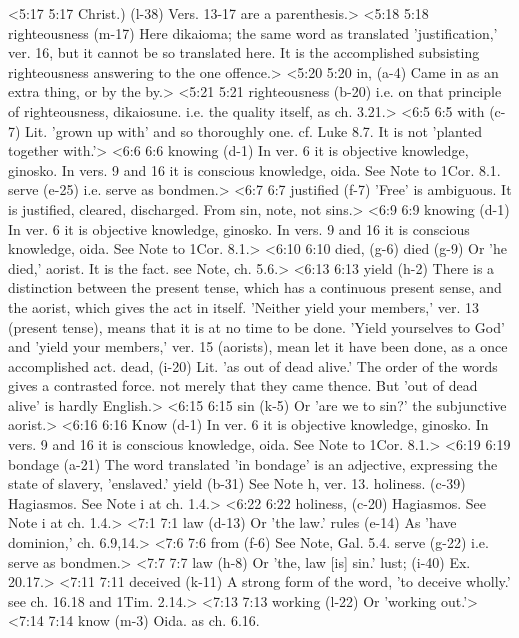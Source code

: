 <5:17 5:17  Christ.) (l-38)  Vers. 13-17 are a parenthesis.>
<5:18 5:18  righteousness (m-17)  Here dikaioma; the same word as translated 'justification,'  ver. 16, but it cannot be so translated here. It is the  accomplished subsisting righteousness answering to the one  offence.>
<5:20 5:20  in, (a-4)  Came in as an extra thing, or by the by.>
<5:21 5:21  righteousness (b-20)  i.e. on that principle of righteousness, dikaiosune. i.e.  the quality itself, as ch. 3.21.>
<6:5 6:5  with (c-7)  Lit. 'grown up with' and so thoroughly one. cf. Luke 8.7. It  is not 'planted together with.'>
<6:6 6:6  knowing (d-1) In ver. 6 it is objective knowledge, ginosko. In vers. 9  and 16 it is conscious knowledge, oida. See Note to 1Cor. 8.1.
  serve (e-25)  i.e. serve as bondmen.>
<6:7 6:7  justified (f-7)  'Free' is ambiguous. It is justified, cleared, discharged.  From sin, note, not sins.>
<6:9 6:9  knowing (d-1) In ver. 6 it is objective knowledge, ginosko. In vers. 9  and 16 it is conscious knowledge, oida. See Note to 1Cor. 8.1.>
<6:10 6:10  died, (g-6)  died (g-9)
  Or 'he died,' aorist. It is the fact. see Note, ch. 5.6.>
<6:13 6:13  yield (h-2)  There is a distinction between the present tense, which has a  continuous present sense, and the aorist, which gives the act  in itself. 'Neither yield your members,' ver. 13 (present  tense), means that it is at no time to be done. 'Yield  yourselves to God' and 'yield your members,' ver. 15 (aorists),  mean let it have been done, as a once accomplished act.
  dead, (i-20)  Lit. 'as out of dead alive.' The order of the words gives a  contrasted force. not merely that they came thence. But 'out of  dead alive' is hardly English.>
<6:15 6:15  sin (k-5)  Or 'are we to sin?' the subjunctive aorist.>
<6:16 6:16  Know (d-1)  In ver. 6 it is objective knowledge, ginosko. In vers. 9  and 16 it is conscious knowledge, oida. See Note to 1Cor. 8.1.>
<6:19 6:19  bondage (a-21)  The word translated 'in bondage' is an adjective, expressing  the state of slavery, 'enslaved.'
  yield (b-31)  See Note h, ver. 13.
  holiness. (c-39)  Hagiasmos. See Note i at ch. 1.4.>
<6:22 6:22  holiness, (c-20)  Hagiasmos. See Note i at ch. 1.4.>
<7:1 7:1  law (d-13)  Or 'the law.'
  rules (e-14)  As 'have dominion,' ch. 6.9,14.>
<7:6 7:6  from (f-6)  See Note, Gal. 5.4.
  serve (g-22)  i.e. serve as bondmen.>
<7:7 7:7  law (h-8)  Or 'the, law [is] sin.'
  lust; (i-40)  Ex. 20.17.>
<7:11 7:11  deceived (k-11)  A strong form of the word, 'to deceive wholly.' see ch. 16.18  and 1Tim. 2.14.>
<7:13 7:13  working (l-22)  Or 'working out.'>
<7:14 7:14  know (m-3)  Oida. as ch. 6.16.
